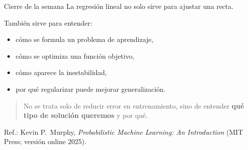 \begin{frame}{Cierre de la semana}
La regresión lineal no solo sirve para ajustar una recta.

\vspace{0.25em}
También sirve para entender:
\begin{itemize}\small
  \item cómo se formula un problema de aprendizaje,
  \item cómo se optimiza una función objetivo,
  \item cómo aparece la inestabilidad,
  \item por qué regularizar puede mejorar generalización.
\end{itemize}

\vspace{0.3em}
\begin{quote}\small
No se trata solo de reducir error en entrenamiento, sino de entender \textbf{qué tipo de solución queremos} y por qué.
\end{quote}
\vspace{0.15em}
{\footnotesize Ref.: Kevin P.\ Murphy, \textit{Probabilistic Machine Learning: An Introduction} (MIT Press; versión online 2025).}
\end{frame}
